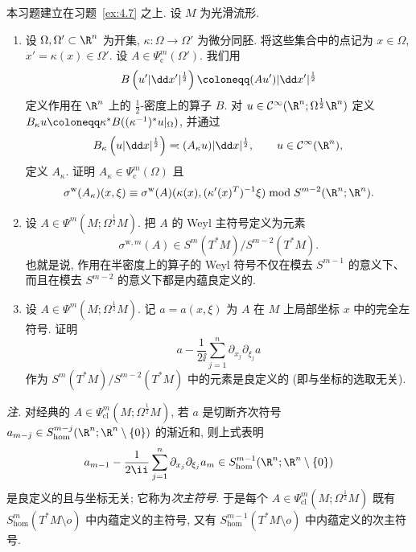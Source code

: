 \begin{exer}[半密度上的算子与次主符号]\label{ex:5.26}
本习题建立在习题~\ref{ex:4.7} 之上. 设 $M$ 为光滑流形.
\begin{enumerate}
    \item 设 $\Omega, \Omega' \subset \R^n$ 为开集, $\kappa \colon \Omega \to \Omega'$ 为微分同胚. 将这些集合中的点记为 $x \in \Omega$, $x' = \kappa(x) \in \Omega'$. 设 $A \in \Psi_{\mathrm{c}}^m(\Omega')$. 我们用
    \begin{equation}\label{eq:5.225}
        B\left( u' |\dd x'|^{\frac{1}{2}} \right) \defeq (A u') |\dd x'|^{\frac{1}{2}}
    \end{equation}
    定义作用在 $\R^n$ 上的 $\frac{1}{2}$-密度上的算子 $B$. 对 $u \in \Smooth(\R^n; \Omega^{\frac{1}{2}}\R^n)$ 定义 $B_\kappa u \defeq \kappa^* B ((\kappa^{-1})^* u|_\Omega)$, 并通过
    \begin{equation}\label{eq:5.226}
        B_\kappa \left( u |\dd x|^{\frac{1}{2}} \right) =\!: (A_\kappa u) |\dd x|^{\frac{1}{2}}, \qquad u \in \Smooth(\R^n),
    \end{equation}
    定义 $A_\kappa$. 证明 $A_\kappa \in \Psi_{\mathrm{c}}^m(\Omega)$ 且
    \begin{equation}\label{eq:5.227}
        \sigma^{\mathrm{w}}(A_\kappa)(x, \xi) \equiv \sigma^{\mathrm{w}}(A)(\kappa(x), (\kappa'(x)^T)^{-1}\xi) \bmod S^{m-2}(\R^n; \R^n).
    \end{equation}
    \item 设 $A \in \Psi^m(M; \Omega^{\frac{1}{2}}M)$. 把 $A$ 的 Weyl 主符号定义为元素
    \begin{equation}\label{eq:5.228}
        \sigma^{\mathrm{w},m}(A) \in S^m(T^* M) / S^{m-2}(T^* M).
    \end{equation}
    也就是说, 作用在半密度上的算子的 Weyl 符号不仅在模去 $S^{m-1}$ 的意义下、而且在模去 $S^{m-2}$ 的意义下都是内蕴良定义的.
    \item 设 $A \in \Psi^m(M; \Omega^{\frac{1}{2}}M)$. 记 $a = a(x, \xi)$ 为 $A$ 在 $M$ 上局部坐标 $x$ 中的完全左符号. 证明
    \begin{equation}\label{eq:5.229}
        a - \frac{1}{2\ii} \sum_{j=1}^n \partial_{x_j} \partial_{\xi_j} a
    \end{equation}
    作为 $S^m(T^* M) / S^{m-2}(T^* M)$ 中的元素是良定义的 (即与坐标的选取无关).
\end{enumerate}
\emph{注.} 对经典的 $A \in \Psi_{\mathrm{cl}}^m(M; \Omega^{\frac{1}{2}}M)$, 若 $a$ 是切断齐次符号 $a_{m-j} \in S_{\mathrm{hom}}^{m-j}(\R^n; \R^n \setminus \{0\})$ 的渐近和, 则上式表明
\begin{equation}\label{eq:5.230}
    a_{m-1} - \frac{1}{2\ii} \sum_{j=1}^n \partial_{x_j} \partial_{\xi_j} a_m \in S_{\mathrm{hom}}^{m-1}(\R^n; \R^n \setminus \{0\})
\end{equation}
是良定义的且与坐标无关; 它称为\emph{次主符号}. 于是每个 $A \in \Psi_{\mathrm{cl}}^m(M; \Omega^{\frac{1}{2}}M)$ 既有 $S_{\mathrm{hom}}^m(T^* M \setminus o)$ 中内蕴定义的主符号, 又有 $S_{\mathrm{hom}}^{m-1}(T^* M \setminus o)$ 中内蕴定义的次主符号.
\end{exer}

